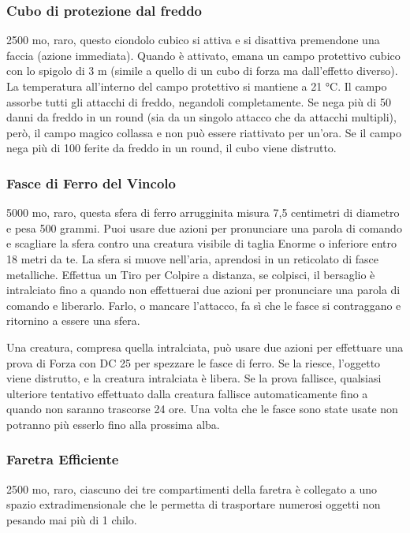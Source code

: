 \begin{multicols}{2}
	\subsubsection*{Cubo di protezione dal freddo}
	2500 mo, raro, questo ciondolo cubico si attiva e si disattiva premendone una faccia (azione immediata). Quando è attivato, emana un campo protettivo cubico con lo spigolo di 3 m (simile a quello di un cubo di forza ma dall'effetto diverso). La temperatura all’interno del campo protettivo si mantiene a 21 °C. Il campo assorbe tutti gli attacchi di freddo, negandoli completamente. Se nega più di 50 danni da freddo in un round (sia da un singolo attacco che da attacchi multipli), però, il campo magico collassa e non può essere riattivato per un'ora. Se il campo nega più di 100 ferite da freddo in un round, il cubo viene distrutto.

	\subsubsection*{Fasce di Ferro del Vincolo}
	5000 mo, raro, questa sfera di ferro arrugginita misura 7,5 centimetri di diametro e pesa 500 grammi. Puoi usare due azioni per pronunciare una parola di comando e scagliare la sfera contro una creatura visibile di taglia Enorme o inferiore entro 18 metri da te. La sfera si muove nell'aria, aprendosi in un reticolato di fasce metalliche. Effettua un Tiro per Colpire a distanza, se colpisci, il bersaglio è intralciato fino a quando non effettuerai due azioni per pronunciare una parola di comando e liberarlo. Farlo, o mancare l'attacco, fa sì che le fasce si contraggano e ritornino a essere una sfera.

	Una creatura, compresa quella intralciata, può usare due azioni per effettuare una prova di Forza con DC 25 per spezzare le fasce di ferro. Se la riesce, l'oggetto viene distrutto, e la creatura intralciata è libera. Se la prova fallisce, qualsiasi ulteriore tentativo effettuato dalla creatura fallisce automaticamente fino a quando non saranno trascorse 24 ore. Una volta che le fasce sono state usate non potranno più esserlo fino alla prossima alba.

	\subsubsection*{Faretra Efficiente}
	2500 mo, raro, ciascuno dei tre compartimenti della faretra è collegato a uno spazio extradimensionale che le permetta di trasportare numerosi oggetti non pesando mai più di 1 chilo.


\end{multicols}
